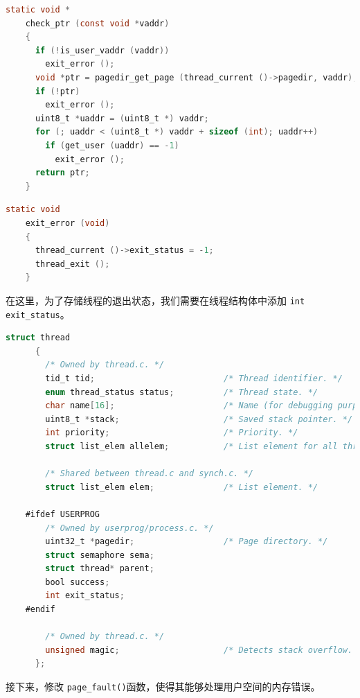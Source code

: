 \documentclass{article}
\begin{document}
\begin{lstlisting}[language=C, title=\texttt{src/userprog/syscall.c - check\_ptr()}]
    static void *
    check_ptr (const void *vaddr)
    {
      if (!is_user_vaddr (vaddr))
        exit_error ();
      void *ptr = pagedir_get_page (thread_current ()->pagedir, vaddr);
      if (!ptr)
        exit_error ();
      uint8_t *uaddr = (uint8_t *) vaddr;
      for (; uaddr < (uint8_t *) vaddr + sizeof (int); uaddr++)
        if (get_user (uaddr) == -1)
          exit_error ();
      return ptr;
    }
\end{lstlisting}

\begin{lstlisting}[language=C, title=\texttt{src/userprog/syscall.c - exit\_error()}]
    static void
    exit_error (void)
    {
      thread_current ()->exit_status = -1;
      thread_exit ();
    }
\end{lstlisting}

在这里，为了存储线程的退出状态，我们需要在线程结构体中添加 \texttt{int exit\_status}。

\begin{lstlisting}[language=C, title=\texttt{src/threads/thread.h}]
    struct thread
      {
        /* Owned by thread.c. */
        tid_t tid;                          /* Thread identifier. */
        enum thread_status status;          /* Thread state. */
        char name[16];                      /* Name (for debugging purposes). */
        uint8_t *stack;                     /* Saved stack pointer. */
        int priority;                       /* Priority. */
        struct list_elem allelem;           /* List element for all threads list. */

        /* Shared between thread.c and synch.c. */
        struct list_elem elem;              /* List element. */

    #ifdef USERPROG
        /* Owned by userprog/process.c. */
        uint32_t *pagedir;                  /* Page directory. */
        struct semaphore sema;
        struct thread* parent;
        bool success;
        int exit_status;
    #endif

        /* Owned by thread.c. */
        unsigned magic;                     /* Detects stack overflow. */
      };
\end{lstlisting}

接下来，修改 \texttt{page\_fault()}函数，使得其能够处理用户空间的内存错误。
\end{document}
